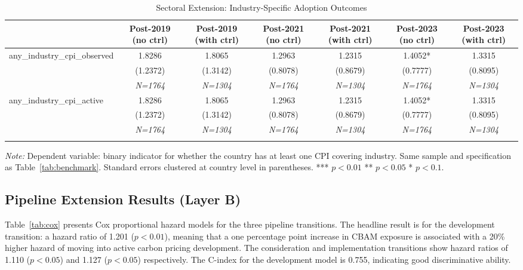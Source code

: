 \documentclass[12pt,a4paper]{article}
\begin{document}
\begin{table}[htbp]
\centering
\begin{threeparttable}
\caption{Sectoral Extension: Industry-Specific Adoption Outcomes}\label{tab:sectoral}
\small
\begin{tabular}{lcccccc}
\toprule
 & Post-2019 (no ctrl) & Post-2019 (with ctrl) & Post-2021 (no ctrl) & Post-2021 (with ctrl) & Post-2023 (no ctrl) & Post-2023 (with ctrl) \\
\midrule
any\_industry\_cpi\_observed & 1.8286 & 1.8065 & 1.2963 & 1.2315 & 1.4052* & 1.3315 \\
 & (1.2372) & (1.3142) & (0.8078) & (0.8679) & (0.7777) & (0.8095) \\
 & \textit{N=1764} & \textit{N=1304} & \textit{N=1764} & \textit{N=1304} & \textit{N=1764} & \textit{N=1304} \\
\addlinespace
any\_industry\_cpi\_active & 1.8286 & 1.8065 & 1.2963 & 1.2315 & 1.4052* & 1.3315 \\
 & (1.2372) & (1.3142) & (0.8078) & (0.8679) & (0.7777) & (0.8095) \\
 & \textit{N=1764} & \textit{N=1304} & \textit{N=1764} & \textit{N=1304} & \textit{N=1764} & \textit{N=1304} \\
\addlinespace
\bottomrule
\end{tabular}
\begin{tablenotes}\small
\item \textit{Note:} Dependent variable: binary indicator for whether the country has at least one CPI covering industry. Same sample and specification as Table~\ref{tab:benchmark}. Standard errors clustered at country level in parentheses. *** $p<0.01$ ** $p<0.05$ * $p<0.1$.
\end{tablenotes}
\end{threeparttable}
\end{table}

\subsection{Pipeline Extension Results (Layer B)}\label{sec:pipeline_results}

Table~\ref{tab:cox} presents Cox proportional hazard models for the three pipeline transitions. The headline result is for the development transition: a hazard ratio of 1.201 ($p<0.01$), meaning that a one percentage point increase in CBAM exposure is associated with a 20\% higher hazard of moving into active carbon pricing development. The consideration and implementation transitions show hazard ratios of 1.110 ($p<0.05$) and 1.127 ($p<0.05$) respectively. The C-index for the development model is 0.755, indicating good discriminative ability.
\end{document}
